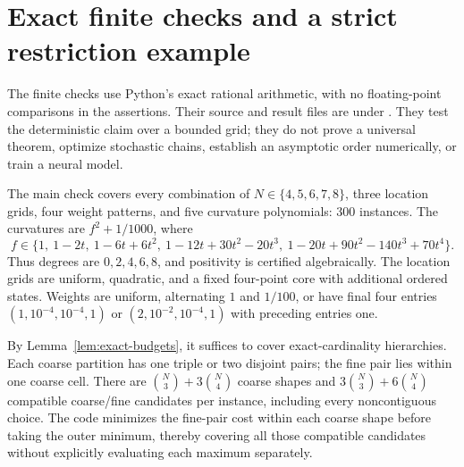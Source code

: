 \section{Exact finite checks and a strict restriction example}
\label{sec:computation}
The finite checks use Python's exact rational arithmetic, with no
floating-point comparisons in the assertions. Their source and result
files are under . They test the deterministic
claim over a bounded grid; they do not prove a universal theorem, optimize
stochastic chains, establish an asymptotic order numerically, or train a
neural model.

The main check covers every combination of $N\in\{4,5,6,7,8\}$, three
location grids, four weight patterns, and five curvature polynomials:
300 instances. The curvatures are $f^2+1/1000$, where
\[
 f\in\{1,\ 1-2t,\ 1-6t+6t^2,\ 1-12t+30t^2-20t^3,
          \ 1-20t+90t^2-140t^3+70t^4\}.
\]
Thus degrees are $0,2,4,6,8$, and positivity is certified algebraically.
The location grids are uniform, quadratic, and a fixed four-point core
with additional ordered states. Weights are uniform, alternating $1$
and $1/100$, or have final four entries $(1,10^{-4},10^{-4},1)$ or
$(2,10^{-2},10^{-4},1)$ with preceding entries one.

By Lemma~\ref{lem:exact-budgets}, it suffices to cover exact-cardinality
hierarchies. Each coarse partition has one triple or two disjoint pairs;
the fine pair lies within one coarse cell. There are
$\binom N3+3\binom N4$ coarse shapes and
$3\binom N3+6\binom N4$ compatible coarse/fine candidates per instance,
including every noncontiguous choice. The code minimizes the fine-pair
cost within each coarse shape before taking the outer minimum, thereby
covering all those compatible candidates without explicitly evaluating
each maximum separately.

